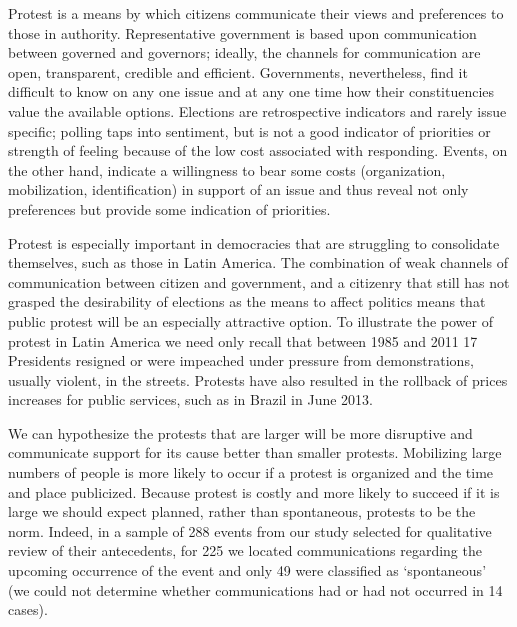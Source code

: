 Protest is a means by which citizens communicate their views and preferences to those in authority. Representative government is based upon communication between governed and governors; ideally, the channels for communication are open, transparent, credible and efficient. Governments, nevertheless, find it difficult to know on any one issue and at any one time how their constituencies value the available options. Elections are retrospective indicators and rarely issue specific; polling taps into sentiment, but is not a good indicator of priorities or strength of feeling because of the low cost associated with responding. Events, on the other hand, indicate a willingness to bear some costs (organization, mobilization, identification) in support of an issue and thus reveal not only preferences but provide some indication of priorities.
 
Protest is especially important in democracies that are struggling to consolidate themselves, such as those in Latin America. The combination of weak channels of communication between citizen and government, and a citizenry that still has not grasped the desirability of elections as the means to affect politics means that public protest will be an especially attractive option. To illustrate the power of protest in Latin America we need only recall that between 1985 and 2011 17 Presidents resigned or were impeached under pressure from demonstrations, usually violent, in the streets. Protests have also resulted in the rollback of prices increases for public services, such as in Brazil in June 2013.
 
We can hypothesize the protests that are larger will be more disruptive and communicate support for its cause better than smaller protests. Mobilizing large numbers of people is more likely to occur if a protest is organized and the time and place publicized. Because protest is costly and more likely to succeed if it is large we should expect planned, rather than spontaneous, protests to be the norm. Indeed, in a sample of 288 events from our study selected for qualitative review of their antecedents, for 225 we located communications regarding the upcoming occurrence of the event and only 49 were classified as ‘spontaneous’ (we could not determine whether communications had or had not occurred in 14 cases).
